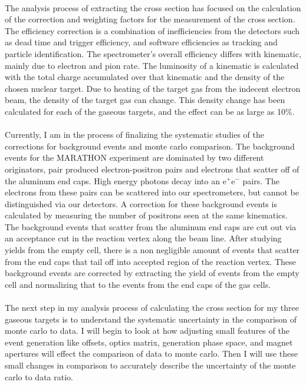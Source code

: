 \documentclass[12pt,letterpaper]{article}
\begin{document}
\paragraph{}
The analysis process of extracting the cross section has focused on the calculation of the correction and weighting factors for the measurement of the cross section. The efficiency correction is a combination of inefficiencies from the detectors such as dead time and trigger efficiency, and software efficiencies as tracking and particle identification. The spectrometer's overall efficiency differs with kinematic, mainly due to electron and pion rate. The luminosity of a kinematic is calculated with the total charge accumulated over that kinematic and the density of the chosen nuclear target. Due to heating of the target gas from the indecent electron beam, the density of the target gas can change. This density change has been calculated for each of the gaseous targets, and the effect can be as large as 10$\%$. 
\paragraph{}Currently, I am in the process of finalizing the systematic studies of the corrections for background events and monte carlo comparison. The background events for the MARATHON experiment are dominated by two different originators, pair produced electron-positron pairs and electrons that scatter off of the aluminum end caps. High energy photons decay into an e$^+$e$^-$ pairs. The electrons from these pairs can be scattered into our spectrometers, but cannot be distinguished via our detectors. A correction for these background events is calculated by measuring the number of positrons seen at the same kinematics. The background events that scatter from the aluminum end caps are cut out via an acceptance cut in the reaction vertex along the beam line. After studying yields from the empty cell, there is a non negligible amount of events that scatter from the end caps that tail off into accepted region of the reaction vertex. These background events are corrected by extracting the yield of events from the empty cell and  normalizing that to the events from the end caps of the gas cells. 
\paragraph{}The next step in my analysis process of calculating the cross section for my three gaseous targets is to understand the systematic uncertainty in the comparison of monte carlo to data. I will begin to look at how adjusting small features of the event generation like offsets, optics matrix, generation phase space, and magnet apertures will effect the comparison of data to monte carlo. Then I will use these small changes in comparison to accurately describe the uncertainty of the monte carlo to data ratio.  
\end{document}
